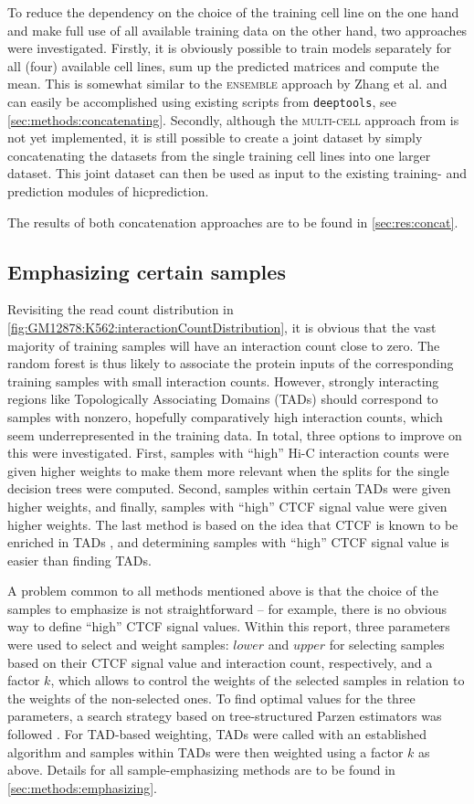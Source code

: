 To reduce the dependency on the choice of the training cell line on the one hand 
and make full use of all available training data on the other hand,
two approaches were investigated.
Firstly, it is obviously possible to train models separately for all (four)
available cell lines, sum up the predicted matrices and compute the mean.
This is somewhat similar to the \textsc{ensemble} approach by Zhang et al. \cite{Zhang2019}
and can easily be accomplished using existing scripts from \texttt{deeptools}, see \autoref{sec:methods:concatenating}.
Secondly, although the \textsc{multi-cell} approach from \cite{Zhang2019} is not yet implemented,
it is still possible to create a joint dataset by simply concatenating the datasets from the single training 
cell lines into one larger dataset.
This joint dataset can then be used as input to the existing training- and prediction modules of hicprediction.

The results of both concatenation approaches are to be found in \autoref{sec:res:concat}.

\subsection{Emphasizing certain samples}
Revisiting the read count distribution in \autoref{fig:GM12878:K562:interactionCountDistribution},
it is obvious that the vast majority of training samples
will have an interaction count close to zero. 
The random forest is thus likely to associate the protein inputs of the corresponding training samples
with small interaction counts.
However, strongly interacting regions like Topologically Associating Domains (TADs) should correspond to samples with nonzero, 
hopefully comparatively high interaction counts, which seem underrepresented in the training data.
In total, three options to improve on this were investigated.
First, samples with ``high'' Hi-C interaction counts were given higher weights
to make them more relevant when the splits for the single decision trees were computed.
Second, samples within certain TADs were given higher weights, and finally, 
samples with ``high'' CTCF signal value were given higher weights.
The last method is based on the idea that CTCF is known to be enriched in TADs \cite{Lee2012},
and determining samples with ``high'' CTCF signal value is easier than finding TADs.

A problem common to all methods mentioned above is that the choice of the samples to emphasize is 
not straightforward -- for example, there is no obvious way to define ``high'' CTCF signal values.
Within this report, three parameters were used to select and weight samples: $lower$ and $upper$ for
selecting samples based on their CTCF signal value and interaction count, respectively, and a factor $k$, which 
allows to control the weights of the selected samples in relation to the weights of the non-selected ones.
To find optimal values for the three parameters, a search strategy based on tree-structured Parzen estimators
was followed \cite{Bergstra2011}.
For TAD-based weighting, TADs were called with an established algorithm and samples within TADs were then 
weighted using a factor $k$ as above. 
Details for all sample-emphasizing methods are to be found in \autoref{sec:methods:emphasizing}.

